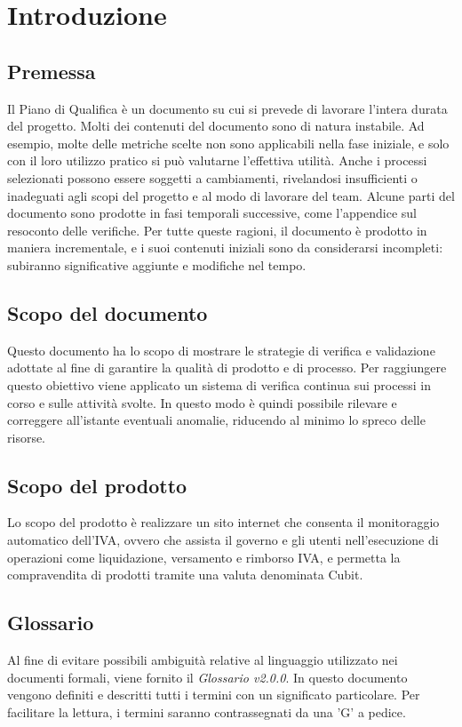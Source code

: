 \section{Introduzione}
\subsection{Premessa}
Il Piano di Qualifica è un documento su cui si prevede di lavorare l'intera durata del progetto.\newline 
Molti dei contenuti del documento sono di natura instabile. Ad esempio, molte delle metriche scelte non sono applicabili nella fase iniziale, e solo con il loro utilizzo pratico si può valutarne l'effettiva utilità. Anche i processi selezionati possono essere soggetti a cambiamenti, rivelandosi insufficienti o inadeguati agli scopi del progetto e al modo di lavorare del team.\newline 
Alcune parti del documento sono prodotte in fasi temporali successive, come l'appendice sul resoconto delle verifiche.\newline 
Per tutte queste ragioni, il documento è prodotto in maniera incrementale, e i suoi contenuti iniziali sono da considerarsi incompleti: subiranno significative aggiunte e modifiche nel tempo.
\subsection{Scopo del documento}
Questo documento ha lo scopo di mostrare le strategie di verifica e validazione adottate al fine di garantire la qualità di prodotto e di processo. Per raggiungere questo obiettivo viene applicato un sistema di verifica continua sui processi in corso e sulle attività svolte. In questo modo è quindi possibile rilevare e correggere all'istante eventuali anomalie, riducendo al minimo lo spreco delle risorse.
\subsection{Scopo del prodotto}
Lo scopo del prodotto è realizzare un sito internet che consenta il monitoraggio automatico dell'IVA, ovvero che assista il governo e gli utenti nell'esecuzione di operazioni come liquidazione, versamento e rimborso IVA, e permetta la compravendita di prodotti tramite una valuta denominata Cubit\glo.
\subsection{Glossario}
Al fine di evitare possibili ambiguità relative al linguaggio utilizzato nei documenti formali, viene fornito il \textit{Glossario v2.0.0}. In questo documento vengono definiti e descritti tutti i termini con un significato particolare. Per facilitare la lettura, i termini saranno contrassegnati da una 'G' a pedice.
